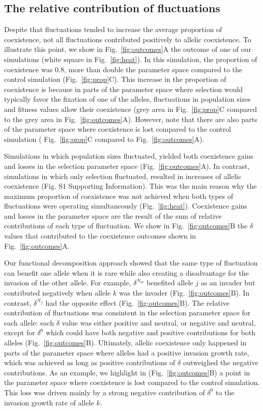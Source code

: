 \documentclass[12pt]{article}
\begin{document}
\subsection*{The relative contribution of fluctuations}

Despite that fluctuations tended to increase the average proportion of coexistence, not all fluctuations contributed positively to allelic coexistence. To illustrate this point, we show in Fig.~\ref{fig:outcomes}A the outcome of one of our simulations  (white square in Fig.~\ref{fig:heat}). In this simulation, the proportion of coexistence was 0.8, more than double the parameter space compared to the control simulation (Fig.~\ref{fig:prop}C). This increase in the proportion of coexistence is because in parts of the parameter space where selection would typically favor the fixation of one of the alleles, fluctuations in population sizes and fitness values allow their coexistence (grey area in Fig.~\ref{fig:prop}C compared to the grey area in Fig.~\ref{fig:outcomes}A). However, note that there are also parts of the parameter space where coexistence is lost compared to the control simulation ( Fig.~\ref{fig:prop}C compared to  Fig.~\ref{fig:outcomes}A).


Simulations in which population sizes fluctuated, yielded both coexistence gains and losses in the selection parameter space (Fig.~\ref{fig:outcomes}A). In contrast, simulations in which only selection fluctuated, resulted in increases of allelic coexistence (Fig. S1 Supporting Information). This was the main reason why the maximum proportion of coexistence was not achieved when both types of fluctuations were operating simultaneously (Fig.~\ref{fig:heat}). Coexistence gains and losses in the parameter space are the result of the sum of relative contributions of each type of fluctuation.  We show in Fig.~\ref{fig:outcomes}B the $\delta$ values that contributed to the coexistence outcomes shown in Fig.~\ref{fig:outcomes}A.

 Our functional decomposition approach showed that the same type of fluctuation can benefit one allele when it is rare while also creating a disadvantage for the invasion of the other allele. For example, $\delta^{N_{m}}$ benefited allele $j$ as an invader but contributed negatively when allele $k$ was the invader (Fig.~\ref{fig:outcomes}B). In contrast, $\delta^ {N_{f}}$ had the opposite effect (Fig.~\ref{fig:outcomes}B). The relative contribution of fluctuations was consintent in the selection parameter space for each allele: each $\delta$ value was either positive and neutral, or negative and neutral, except for $\delta^0$ which could have both negative and positive contributions for both alleles (Fig.~\ref{fig:outcomes}B). Ultimately, allelic coexistence only happened in parts of the parameter space where alleles had a positive invasion growth rate, which was achieved as long as positive contributions of $\delta$ outweighed the negative contributions. As an example, we highlight in (Fig.~\ref{fig:outcomes}B) a point in the parameter space where coexistence is lost compared to the control simulation. This loss was driven mainly by a strong negative contribution of $\delta^0$ to the invasion growth rate of allele $k$.
\end{document}
